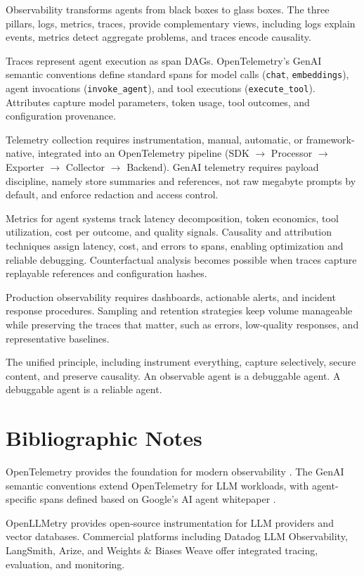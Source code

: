 Observability transforms agents from black boxes to glass boxes. The three pillars, logs, metrics, traces, provide complementary views, including logs explain events, metrics detect aggregate problems, and traces encode causality.

Traces represent agent execution as span DAGs. OpenTelemetry's GenAI semantic conventions define standard spans for model calls (\texttt{chat}, \texttt{embeddings}), agent invocations (\texttt{invoke\_agent}), and tool executions (\texttt{execute\_tool}). Attributes capture model parameters, token usage, tool outcomes, and configuration provenance.

Telemetry collection requires instrumentation, manual, automatic, or framework-native, integrated into an OpenTelemetry pipeline (SDK $\rightarrow$ Processor $\rightarrow$ Exporter $\rightarrow$ Collector $\rightarrow$ Backend). GenAI telemetry requires payload discipline, namely store summaries and references, not raw megabyte prompts by default, and enforce redaction and access control.

Metrics for agent systems track latency decomposition, token economics, tool utilization, cost per outcome, and quality signals. Causality and attribution techniques assign latency, cost, and errors to spans, enabling optimization and reliable debugging. Counterfactual analysis becomes possible when traces capture replayable references and configuration hashes.

Production observability requires dashboards, actionable alerts, and incident response procedures. Sampling and retention strategies keep volume manageable while preserving the traces that matter, such as errors, low-quality responses, and representative baselines.

The unified principle, including instrument everything, capture selectively, secure content, and preserve causality. An observable agent is a debuggable agent. A debuggable agent is a reliable agent.

\section*{Bibliographic Notes}

OpenTelemetry provides the foundation for modern observability \cite{otel2025}. The GenAI semantic conventions extend OpenTelemetry for LLM workloads, with agent-specific spans defined based on Google's AI agent whitepaper \cite{otelgenai2025}.

OpenLLMetry \cite{openllmetry2025} provides open-source instrumentation for LLM providers and vector databases. Commercial platforms including Datadog LLM Observability, LangSmith, Arize, and Weights \& Biases Weave offer integrated tracing, evaluation, and monitoring.

